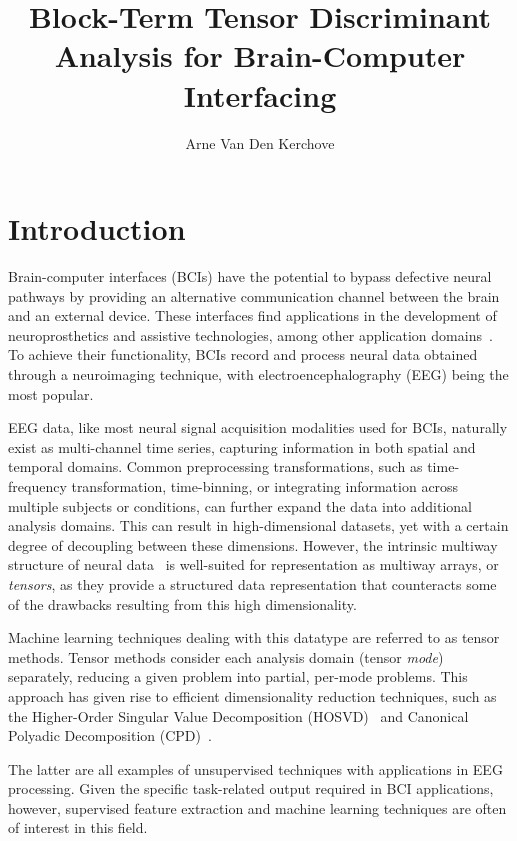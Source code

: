 \documentclass[twocolumn]{article}
\title{Block-Term Tensor Discriminant Analysis for Brain-Computer Interfacing}
\author{Arne Van Den Kerchove}
\begin{document}
\maketitle

\begin{abstract}
\end{abstract}

\section{Introduction}
Brain-computer interfaces (BCIs) have the potential to bypass
defective neural pathways by providing an alternative communication channel between the brain and an
external device.
These interfaces find applications in the development of neuroprosthetics and assistive
technologies, among other application domains~\cite{NicolasAlonso2012}.
To achieve their functionality, BCIs record and process neural data obtained through
a neuroimaging technique, with electroencephalography (EEG) being the most popular.

EEG data, like most neural signal acquisition modalities used for BCIs, naturally
exist as multi-channel time series, capturing information in both spatial and
temporal domains.
Common preprocessing transformations, such as time-frequency transformation,
time-binning, or integrating information across multiple subjects or conditions,
can further expand the data into additional analysis domains.
This can result in high-dimensional datasets, yet with a certain degree of decoupling
between these dimensions.
However, the intrinsic multiway structure of neural data~\cite{Erol2022} is
well-suited for representation as multiway arrays, or \emph{tensors}, as they
provide a structured data representation that counteracts some of the drawbacks
resulting from this high dimensionality.

Machine learning techniques dealing with this datatype are referred to as tensor
methods.
Tensor methods consider each analysis domain (tensor \emph{mode}) separately,
reducing a given problem into partial, per-mode problems.
This approach has given rise to efficient dimensionality reduction techniques,
such as the Higher-Order Singular Value Decomposition (\textsc{HOSVD})~\cite{DeLathauwer2000,SoleCasals2018}
and Canonical Polyadic Decomposition (\textsc{CPD})~\cite{Hitchcock1927,Nazarpour2006}.

The latter are all examples of unsupervised techniques with applications in EEG
processing.
Given the specific task-related output required in BCI applications, however,
supervised feature extraction and machine learning techniques are often of
interest in this field.
\end{document}

